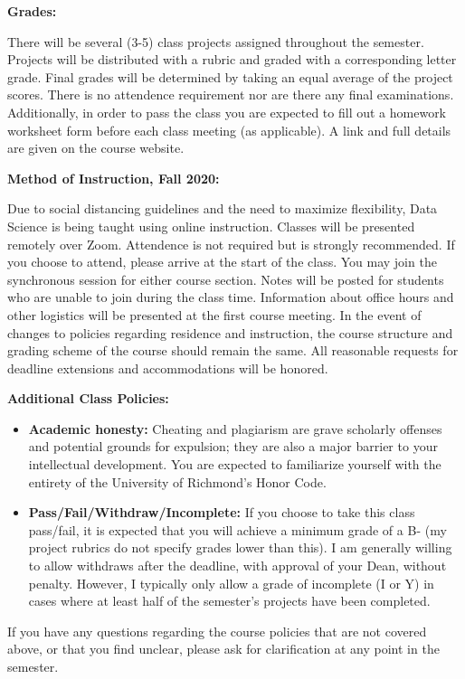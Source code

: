 \documentclass[12pt, a4paper]{article}
\begin{document}
\textbf{Grades:} \vspace{6pt}

There will be several (3-5) class projects assigned throughout the semester. Projects will
be distributed with a rubric and graded with a corresponding letter grade. Final grades will
be determined by taking an equal average of the project scores. There is no attendence
requirement nor are there any final examinations. Additionally, in order to pass the class
you are expected to fill out a homework worksheet form before each class meeting
(as applicable). A link and full details are given on the course website.

\bigskip

\textbf{Method of Instruction, Fall 2020:} \vspace{6pt}

Due to social distancing guidelines and the need to maximize
flexibility, Data Science is being taught using online instruction. Classes will be
presented remotely over Zoom. Attendence is not required but is strongly
recommended. If you choose to attend, please arrive at the start of the class. You may
join the synchronous session for either course section. Notes will be posted for
students who are unable to join during the class time. Information about office hours
and other logistics will be presented at the first course meeting. In the event of changes
to policies regarding residence and instruction, the course structure
and grading scheme of the course should remain the same. All reasonable requests for
deadline extensions and accommodations will be honored.

\bigskip

\textbf{Additional Class Policies:} \vspace{6pt}

\begin{itemize}\setlength\itemsep{0em}
\item \textbf{Academic honesty:}
Cheating and plagiarism are grave scholarly offenses and potential grounds
for expulsion; they are also a major barrier to your intellectual development.
You are expected to familiarize yourself with the entirety of the
University of Richmond’s Honor Code.
\item \textbf{Pass/Fail/Withdraw/Incomplete:} If you choose to take this
class pass/fail, it is expected that you will achieve a minimum grade of a B- (my project
rubrics do not specify grades lower than this). I am generally willing to allow withdraws
after the deadline, with approval of your Dean, without penalty. However, I typically only
allow a grade of incomplete (I or Y) in cases where at least half of the semester's projects
have been completed.
\end{itemize}

If you have any questions regarding the course policies that are not covered above, or
that you find unclear, please ask for clarification at any point in the semester.
\end{document}
